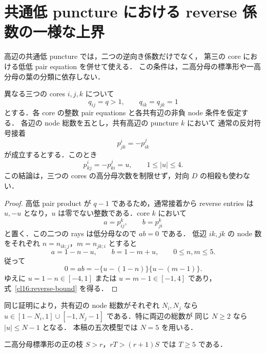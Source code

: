 
\section{共通低 puncture における reverse 係数の一様な上界}
\label{cl16:section}

高辺の共通低 puncture では，二つの逆向き係数だけでなく，
第三の core における低低 pair equation を併せて使える．
この条件は，二高分母の標準形や一高分母の葉の分類に依存しない．

\begin{lemma}
\label{cl16:ordinary-bound}
異なる三つの cores $i,j,k$ について
\[
 q_{ij}=q>1,\qquad q_{ik}=q_{jk}=1
\]
とする．各 core の整数 pair equations と各共有辺の非負 node 条件を仮定する．
各辺の node 総数を五とし，共有高辺の puncture $k$ において
通常の反対符号接着
\[
 p^i_{jk}=-p^j_{ik}
\]
が成立するとする．このとき
\begin{equation}\label{cl16:reverse-bound}
 p^i_{kj}=-p^j_{ki}=u,\qquad 1\le |u|\le4.
\end{equation}
この結論は，三つの cores の高分母次数を制限せず，対向 $D$ の相殺も使わない．
\end{lemma}

\begin{proof}
高低 pair product が $q-1$ であるため，通常接着から reverse entries は
$u,-u$ となり，$u$ は零でない整数である．core $k$ において
\[
 a=p^k_{ij},\qquad b=p^k_{ji}
\]
と置く．この二つの rays は低分母なので $ab=0$ である．
低辺 $ik,jk$ の node 数をそれぞれ $n=n_{ik;j}$，$m=n_{jk;i}$ とすると
\[
 a=1-n-u,\qquad b=1-m+u,\qquad 0\le n,m\le5.
\]
従って
\[
 0=ab=-\{u-(1-n)\}\{u-(m-1)\}.
\]
ゆえに $u=1-n\in[-4,1]$ または $u=m-1\in[-1,4]$ であり，
式~\eqref{cl16:reverse-bound} を得る．
\end{proof}

\begin{remark}[他の node 予算]
同じ証明により，共有辺の node 総数がそれぞれ $N_i,N_j$ なら
$u\in[1-N_i,1]\cup[-1,N_j-1]$ である．特に両辺の総数が
同じ $N\ge2$ なら $|u|\le N-1$ となる．
本稿の五次模型では $N=5$ を用いる．
\end{remark}

\begin{lemma}
\label{cl16:T-five}
二高分母標準形の正の枝 $S>r$，$rT>(r+1)S$ では $T\ge5$ である．
\end{lemma}

